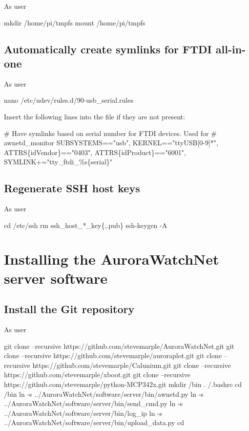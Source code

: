 As user \rootUser
\begin{Cmd}
mkdir /home/pi/tmpfs
mount /home/pi/tmpfs
\end{Cmd}

\subsection{Automatically create symlinks for FTDI all-in-one}

As user \rootUser
\begin{Cmd}
nano /etc/udev/rules.d/90-usb_serial.rules
\end{Cmd}

Insert the following lines into the file if they are not present:
\begin{Cmd}[fontsize=\relsize{-3}]
# Have symlinks based on serial number for FTDI devices. Used for 
# awnetd_monitor
SUBSYSTEMS=="usb", KERNEL=="ttyUSB[0-9]*", ATTRS\{idVendor\}=="0403", ATTRS\{idProduct\}=="6001", SYMLINK+="tty_ftdi_\%s\{serial\}"  
\end{Cmd}

\subsection{Regenerate SSH host keys}

As user \rootUser
\begin{Cmd}
cd /etc/ssh
rm ssh_host_*_key\{,.pub\}
ssh-keygen -A
\end{Cmd}

\newpage
\section{Installing the AuroraWatchNet server software}

\subsection{Install the Git repository}
As user \piUser
\begin{Cmd}
git clone --recursive https://github.com/stevemarple/AuroraWatchNet.git 
git clone --recursive https://github.com/stevemarple/auroraplot.git
git clone --recursive https://github.com/stevemarple/Calunium.git
git clone --recursive https://github.com/stevemarple/xboot.git
git clone --recursive https://github.com/stevemarple/python-MCP342x.git
mkdir \mytilde/bin
. \mytilde/.bashrc
cd \mytilde/bin
ln -s ../AuroraWatchNet/software/server/bin/awnetd.py
ln -s ../AuroraWatchNet/software/server/bin/send_cmd.py
ln -s ../AuroraWatchNet/software/server/bin/log_ip
ln -s ../AuroraWatchNet/software/server/bin/upload_data.py
cd \mytilde
\end{Cmd}

